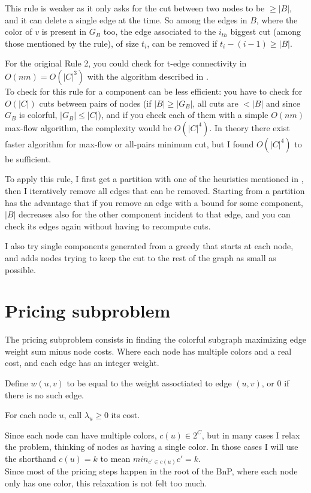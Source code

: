 \documentclass{article}
\begin{document}
This rule is weaker as it only asks for the cut between two nodes to be $\ge |B|$, and it can delete a single edge at the time.
So among the edges in $B$, where the color of $v$ is present in $G_B$ too, the edge associated to the $i_{th}$ biggest cut (among those mentioned by the rule), of size $t_i$, can be removed if $t_i - (i-1) \ge |B|$.

For the original Rule 2, you could check for t-edge connectivity in $O(nm) = O(|C|^3)$ with the algorithm described in \parencite{matula}.\\
To check for this rule for a component can be less efficient:
you have to check for $O(|C|)$ cuts between pairs of nodes (if $|B| \ge |G_B|$, all cuts are $<|B|$ and since $G_B$ is colorful, $|G_B| \le |C|$),
and if you check each of them with a simple $O(nm)$ max-flow algorithm, the complexity would be $O(|C|^4)$.
In theory there exist faster algorithm for max-flow or all-pairs minimum cut, but I found $O(|C|^4)$ to be sufficient.

To apply this rule, I first get a partition with one of the heuristics mentioned in ,
then I iteratively remove all edges that can be removed.
Starting from a partition has the advantage that if you remove an edge with a bound for some component,
$|B|$ decreases also for the other component incident to that edge,
and you can check its edges again without having to recompute cuts.

I also try single components generated from a greedy that starts at each node,
and adds nodes trying to keep the cut to the rest of the graph as small as possible.

\section{Pricing subproblem}
The pricing subproblem consists in finding the colorful subgraph maximizing edge weight sum minus node costs.
Where each node has multiple colors and a real cost, and each edge has an integer weight.

Define $w(u,v)$ to be equal to the weight assoctiated to edge $(u,v)$, or $0$ if there is no such edge.

For each node $u$, call $\lambda_u \ge 0$ its cost.

Since each node can have multiple colors, $c(u) \in 2^C$,
but in many cases I relax the problem, thinking of nodes as having a single color.
In those cases I will use the shorthand $c(u)=k$ to mean $min_{c' \in c(u)}{c'} = k$.\\
Since most of the pricing steps happen in the root of the BnP,
where each node only has one color, this relaxation is not felt too much.
\end{document}
